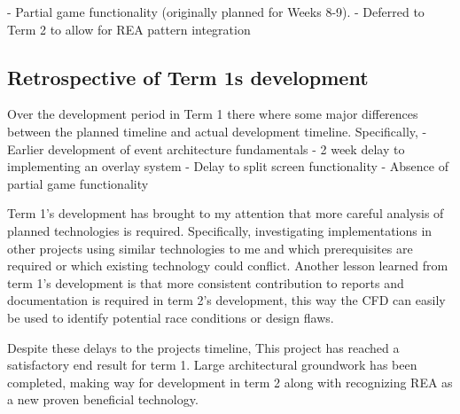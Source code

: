 \documentclass[]{final_report}
\begin{document}
 - Partial game functionality (originally planned for Weeks 8-9). \newline
 - Deferred to Term 2 to allow for REA pattern integration \newline
 
 \subsection{Retrospective of Term 1s development}
 Over the development period in Term 1 there where some major differences between the planned timeline and actual development timeline. Specifically, \newline
 - Earlier development of event architecture fundamentals \newline
 - 2 week delay to implementing an overlay system \newline
 - Delay to split screen functionality \newline
 - Absence of partial game functionality \newline
 
 Term 1's development has brought to my attention that more careful analysis of planned technologies is required. Specifically, investigating implementations in other projects using similar technologies to me and which prerequisites are required or which existing technology could conflict. Another lesson learned from term 1's development is that more consistent contribution to reports and documentation is required in term 2's development, this way the CFD can easily be used to identify potential race conditions or design flaws.
 
 Despite these delays to the projects timeline, This project has reached a satisfactory end result for term 1. Large architectural groundwork has been completed, making way for development in term 2 along with recognizing REA as a new proven beneficial technology.
 
\end{document}
